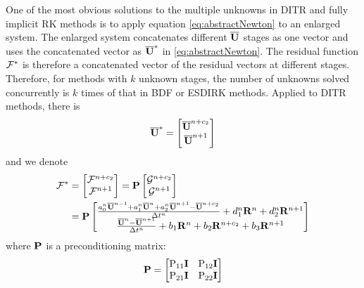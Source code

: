 One of the most obvious solutions to the multiple unknowns
in DITR and fully implicit RK methods is to apply
equation \eqref{eq:abstractNewton} to an enlarged
system.
The enlarged system concatenates different $\overline{\mathbf{U}}$
stages as one vector and uses the concatenated vector as
$\overline{\mathbf{U}}^*$ in \eqref{eq:abstractNewton}.
The residual function $\mathcal{F}^*$ is therefore a concatenated vector of
the residual vectors at different stages.
Therefore, for methods with $k$ unknown stages, the number of
unknowns solved concurrently is $k$ times of that in BDF or ESDIRK methods.
Applied to DITR methods, there is
\begin{equation}
    \overline{\mathbf{U}}^* = \begin{bmatrix}
        \overline{\mathbf{U}}^{n+c_2} \\
        \overline{\mathbf{U}}^{n+1}
    \end{bmatrix}
\end{equation}
and we denote
\begin{equation}
    \begin{aligned}
        \mathcal{F}^* & =\begin{bmatrix}
                     \mathcal{F}^{n+c_2} \\
                     \mathcal{F}^{n+1}
                 \end{bmatrix} = \mathbf{P}\begin{bmatrix}
                                        \mathcal{G}^{n+c_2} \\
                                        \mathcal{G}^{n+1}
                                    \end{bmatrix} \\ & = \mathbf{P}\begin{bmatrix}
            \frac{a^n_0\overline{\mathbf{U}}^{n - 1} +
                a^n_1\overline{\mathbf{U}}^{n} +
                a^n_2\overline{\mathbf{U}}^{n + 1} - \overline{\mathbf{U}}^{n+c_2}}{{\Delta} t^n}
            +
            d^n_1\mathbf{R}^{n} +
            d^n_2\mathbf{R}^{n + 1}
            \\
            \frac{\overline{\mathbf{U}}^{n} - \overline{\mathbf{U}}^{n+1}}{{\Delta} t^n}  +
            b_1 \mathbf{R}^n +
            b_2 \mathbf{R}^{n+c_2} +
            b_3 \mathbf{R}^{n+1}
        \end{bmatrix}
        \label{eq:DITRFFDef}
    \end{aligned}
\end{equation}
where $\mathbf{P}$ is a preconditioning matrix:
\begin{equation}
    \mathbf{P} = \begin{bmatrix}
        \mathrm{P}_{11}\mathbf{I} & \mathrm{P}_{12}\mathbf{I} \\
        \mathrm{P}_{21}\mathbf{I} & \mathrm{P}_{22}\mathbf{I} \\
    \end{bmatrix}
\end{equation}
